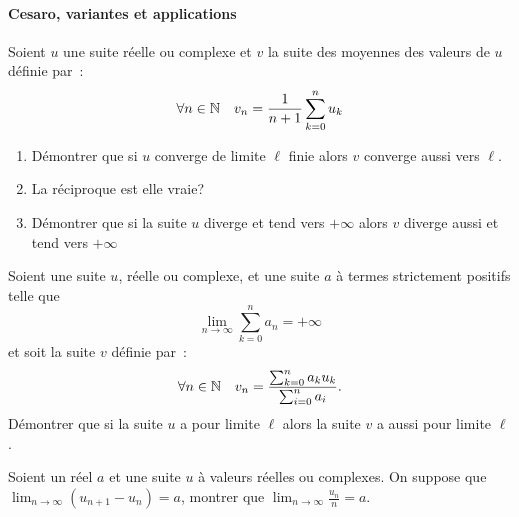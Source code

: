 \paragraph{Cesaro, variantes et applications}
\begin{exercice}
    Soient \(u\) une suite réelle ou complexe et \(v\) la suite des 
    moyennes des valeurs de \(u\) définie par~:
    \[ \forall n \in \mathbb{N} \quad v_n = \frac{1}{n+1}\sum_{k = 0}^n u_k \]
    \begin{enumerate}
        \item Démontrer que si \(u\) converge de limite \(\ell\) finie alors 
            \(v\) converge aussi vers \(\ell\).
        \item La réciproque est elle vraie?
        \item Démontrer que si la suite \(u\) diverge et tend vers 
            \(+\infty\) alors \(v\) diverge aussi et tend vers \(+\infty\)
    \end{enumerate}
\end{exercice}
\begin{exercice}
    Soient une suite \(u\), réelle ou complexe, et une suite \(a\) à 
    termes strictement positifs telle que \[\lim_{n \to \infty} \sum_{k 
    = 0}^n a_n = +\infty\] et soit la suite \(v\) définie par~:
    \[\forall n \in \mathbb{N} \quad v_n = \frac{\sum_{k = 0}^n a_k u_k}{\sum_{i 
    = 0}^n a_i}.\]
    Démontrer que si la suite \(u\) a pour limite \(\ell\) alors la 
    suite \(v\) a aussi pour limite \(\ell\).
\end{exercice}
\begin{exercice}
    Soient un réel \(a\) et une suite \(u\) à valeurs réelles ou 
    complexes. On suppose que \(\lim_{n\to\infty} (u_{n+1}-u_n) = a\), 
    montrer que \(\lim_{n\to\infty} \frac{u_n}{n} = a\).
\end{exercice}
